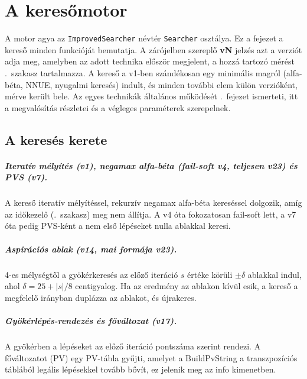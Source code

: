 \chapter{A keresőmotor}\label{chap:search}

A motor agya az \texttt{ImprovedSearcher} névtér \texttt{Searcher} osztálya. Ez a fejezet a kereső minden funkcióját bemutatja. A zárójelben szereplő \textbf{vN} jelzés azt a verziót adja meg, amelyben az adott technika először megjelent, a hozzá tartozó mérést .~szakasz tartalmazza. A kereső a v1-ben szándékosan egy minimális magról (alfa-béta, NNUE, nyugalmi keresés) indult, és minden további elem külön verzióként, mérve került bele. Az egyes technikák általános működését .~fejezet ismerteti, itt a megvalósítás részletei és a végleges paraméterek szerepelnek.

\section{A keresés kerete}

\paragraph{Iteratív mélyítés (v1), negamax alfa-béta (fail-soft v4, teljesen v23) és PVS (v7).} A kereső iteratív mélyítéssel, rekurzív negamax alfa-béta kereséssel dolgozik, amíg az időkezelő (.~szakasz) meg nem állítja. A v4 óta fokozatosan fail-soft lett, a v7 óta pedig PVS-ként a nem első lépéseket nulla ablakkal keresi.

\paragraph{Aspirációs ablak (v14, mai formája v23).} 4-es mélységtől a gyökérkeresés az előző iteráció $s$ értéke körüli $\pm\delta$ ablakkal indul, ahol $\delta = 25 + |s|/8$ centigyalog. Ha az eredmény az ablakon kívül esik, a kereső a megfelelő irányban duplázza az ablakot, és újrakeres.

\paragraph{Gyökérlépés-rendezés és főváltozat (v17).} A gyökérben a lépéseket az előző iteráció pontszáma szerint rendezi. A főváltozatot (PV) egy  PV-tábla gyűjti, amelyet a BuildPvString a transzpozíciós táblából legális lépésekkel tovább bővít, ez jelenik meg az info kimenetben.

